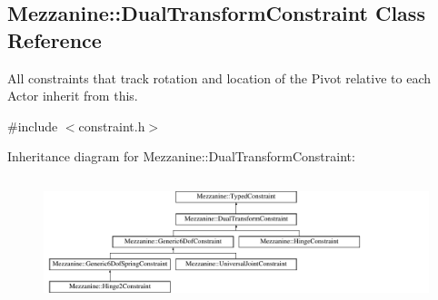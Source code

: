\hypertarget{classMezzanine_1_1DualTransformConstraint}{
\subsection{Mezzanine::DualTransformConstraint Class Reference}
\label{classMezzanine_1_1DualTransformConstraint}
}


All constraints that track rotation and location of the Pivot relative to each Actor inherit from this.  




{\ttfamily \#include $<$constraint.h$>$}

Inheritance diagram for Mezzanine::DualTransformConstraint:\begin{figure}[H]
\begin{center}
\leavevmode
\includegraphics[height=3.689065cm]{classMezzanine_1_1DualTransformConstraint}
\end{center}
\end{figure}
